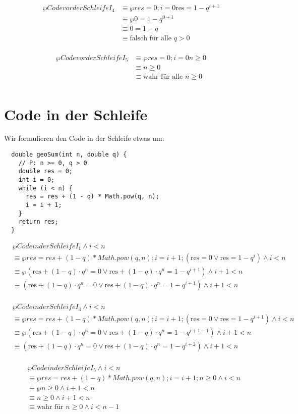 \documentclass{lehramt-informatik-aufgabe}
\begin{document}
\begin{align*}
\wp{Code vor der Schleife}{I_4}
& \equiv \wp{res = 0; i = 0}{\text{res} = 1 - q^{i+1}} \\
& \equiv \wp{}{0 = 1 - q^{0+1}} \\
& \equiv 0 = 1 - q \\
& \equiv \text{falsch für alle } q > 0\\
\end{align*}

\begin{align*}
\wp{Code vor der Schleife}{I_5}
& \equiv \wp{res = 0; i = 0}{n \geq 0} \\
& \equiv n \geq 0 \\
& \equiv \text{wahr für alle } n \geq 0\\
\end{align*}

\section{Code in der Schleife}

Wir formulieren den Code in der Schleife etwas um:

\begin{verbatim}
  double geoSum(int n, double q) {
    // P: n >= 0, q > 0
    double res = 0;
    int i = 0;
    while (i < n) {
      res = res + (1 - q) * Math.pow(q, n);
      i = i + 1;
    }
    return res;
  }
\end{verbatim}

\begin{align*}
&\wp{Code in der Schleife}{I_1 \land i < n}\\
&\equiv \wp{res = res + (1-q) * Math.pow(q, n); i = i + 1;}
{(\text{res} = 0 \lor \text{res} = 1 - q^i) \land i < n} \\
&\equiv \wp{}
{(\text{res} + (1-q) \cdot q^n = 0 \lor \text{res} + (1-q) \cdot q^n = 1 - q^{i + 1}) \land i + 1 < n} \\
&\equiv
(\text{res} + (1-q) \cdot q^n = 0 \lor \text{res} + (1-q) \cdot q^n = 1 - q^{i + 1}) \land i + 1 < n \\
\end{align*}

\begin{align*}
&\wp{Code in der Schleife}{I_3 \land i < n}\\
& \equiv \wp{res = res + (1-q) * Math.pow(q, n); i = i + 1;}
{(\text{res} = 0 \lor \text{res} = 1 - q^{i+1}) \land i < n} \\
& \equiv \wp{}
{(\text{res} + (1-q) \cdot q^n = 0 \lor \text{res} + (1-q) \cdot q^n  = 1 - q^{i + 1 + 1}) \land i + 1 < n} \\
& \equiv
(\text{res} + (1-q) \cdot q^n = 0 \lor \text{res} + (1-q) \cdot q^n  = 1 - q^{i + 2}) \land i + 1 < n \\
\end{align*}

\begin{align*}
&\wp{Code in der Schleife}{I_5 \land i < n}\\
& \equiv \wp{res = res + (1-q) * Math.pow(q, n); i = i + 1;}{n \geq 0 \land i < n} \\
& \equiv \wp{}{n \geq 0 \land i + 1 < n} \\
& \equiv n \geq 0 \land i + 1 < n \\
& \equiv \text{wahr für }n \geq 0 \land i < n - 1 \\
\end{align*}
\end{document}
